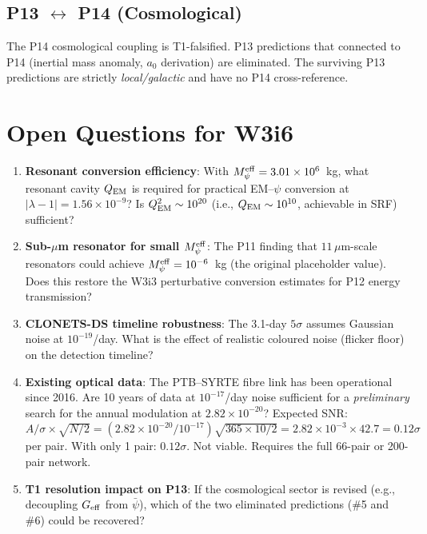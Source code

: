 \documentclass[aps,prd,twocolumn,superscriptaddress,nofootinbib]{revtex4-2}
\newcommand{\Meff}{M_\psi^{\rm eff}}
\newcommand{\ee}[1]{\times 10^{#1}}
\begin{document}
\subsection{P13 $\leftrightarrow$ P14 (Cosmological)}

The P14 cosmological coupling is T1-falsified. P13 predictions
that connected to P14 (inertial mass anomaly, $a_0$ derivation)
are eliminated. The surviving P13 predictions are strictly
\emph{local/galactic} and have no P14 cross-reference.

\section{Open Questions for W3i6}
\label{sec:open}

\begin{enumerate}
\item \textbf{Resonant conversion efficiency}: With $\Meff = 3.01\ee{6}$~kg,
  what resonant cavity $Q_{\rm EM}$ is required for practical EM--$\psi$
  conversion at $|\lambda-1| = 1.56\ee{-9}$? Is $Q_{\rm EM}^2 \sim 10^{20}$
  (i.e., $Q_{\rm EM} \sim 10^{10}$, achievable in SRF) sufficient?

\item \textbf{Sub-$\mu$m resonator for small $\Meff$}: The P11 finding
  that $11\,\mu$m-scale resonators could achieve $\Meff = 10^{-6}$~kg
  (the original placeholder value). Does this restore the W3i3
  perturbative conversion estimates for P12 energy transmission?

\item \textbf{CLONETS-DS timeline robustness}: The 3.1-day $5\sigma$
  assumes Gaussian noise at $10^{-19}$/day. What is the effect of
  realistic coloured noise (flicker floor) on the detection timeline?

\item \textbf{Existing optical data}: The PTB--SYRTE fibre link has
  been operational since 2016. Are 10 years of data at $10^{-17}$/day
  noise sufficient for a \emph{preliminary} search for the annual
  modulation at $2.82\ee{-20}$? Expected SNR: $A/\sigma\times\sqrt{N/2}
  = (2.82\ee{-20}/10^{-17})\sqrt{365\times10/2} = 2.82\ee{-3}\times42.7
  = 0.12\sigma$ per pair. With only 1 pair: $0.12\sigma$. Not viable.
  Requires the full 66-pair or 200-pair network.

\item \textbf{T1 resolution impact on P13}: If the cosmological sector
  is revised (e.g., decoupling $G_{\rm eff}$ from $\bar{\psi}$), which
  of the two eliminated predictions (\#5 and \#6) could be recovered?
\end{enumerate}
\end{document}
